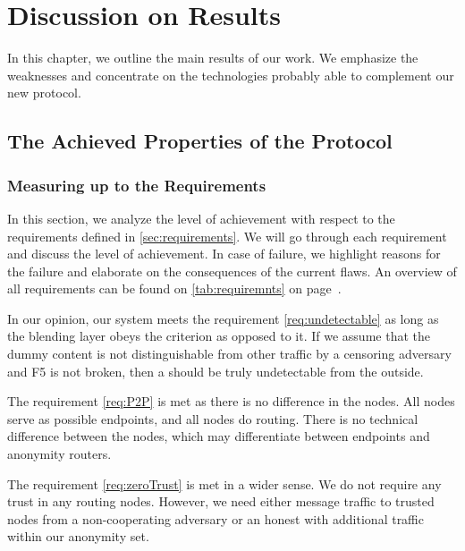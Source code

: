 \part{Discussion on Results}

In this chapter, we outline the main results of our work. We emphasize the weaknesses and concentrate on the technologies probably able to complement our new protocol.

\chapter{The Achieved Properties of the Protocol}
\section{Measuring up to the Requirements\label{sec:reqDiscussion}}
In this section, we analyze the level of achievement with respect to the requirements defined in \cref{sec:requirements}. We will go through each requirement and discuss the level of achievement. In case of failure, we highlight reasons for the failure and elaborate on the consequences of the current flaws. An overview of all requirements can be found on \cref{tab:requiremnts} on page~\pageref{tab:requiremnts}.

In our opinion, our system meets the requirement \ref{req:undetectable} as long as the blending layer obeys the criterion as opposed to it. If we assume that the dummy content is not distinguishable from other traffic by a censoring adversary and F5 is not broken, then a \VortexNode{} should be truly undetectable from the outside.

The requirement \ref{req:P2P} is met as there is no difference in the nodes. All nodes serve as possible endpoints, and all nodes do routing. There is no technical difference between the nodes, which may differentiate between endpoints and anonymity routers.

The requirement \ref{req:zeroTrust} is met in a wider sense. We do not require any trust in any routing nodes. However, we need either message traffic to trusted nodes from a non-cooperating adversary or an honest \VortexNodes{} with additional traffic within our anonymity set. 

